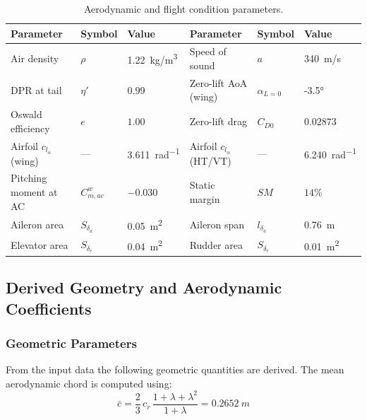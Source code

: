\begin{table}[H]
  \centering
  \caption{Aerodynamic and flight condition parameters.}
  \label{tab:aero_params}
  \begin{tabular}{lll lll}
    \toprule
    \textbf{Parameter} & \textbf{Symbol} & \textbf{Value}
    & \textbf{Parameter} & \textbf{Symbol} & \textbf{Value} \\
    \midrule
    Air density              & $\rho$              & \SI{1.22}{kg/m^3}
    & Speed of sound         & $a$                 & \SI{340}{m/s}    \\
    DPR at tail              & $\eta'$             & $0.99$
    & Zero-lift AoA (wing)   & $\alpha_{L=0}$      & \ang{-3.5}       \\
    Oswald efficiency        & $e$                 & $1.00$
    & Zero-lift drag         & $C_{D0}$            & $0.02873$        \\
    Airfoil $c_{l_\alpha}$ (wing) & ---           & \SI{3.611}{rad^{-1}}
    & Airfoil $c_{l_\alpha}$ (HT/VT) & ---        & \SI{6.240}{rad^{-1}} \\
    Pitching moment at AC    & $C_{m,ac}^{w}$      & $-0.030$
    & Static margin          & $SM$                & $14\%$           \\
    Aileron area             & $S_{\delta_a}$      & \SI{0.05}{m^2}
    & Aileron span           & $l_{\delta_a}$      & \SI{0.76}{m}     \\
    Elevator area            & $S_{\delta_e}$      & \SI{0.04}{m^2}
    & Rudder area            & $S_{\delta_r}$      & \SI{0.01}{m^2}   \\
    \bottomrule
  \end{tabular}
\end{table}

\subsection{Derived Geometry and Aerodynamic Coefficients}
\label{subsec:geometry_aero}

\subsubsection{Geometric Parameters}

From the input data the following geometric quantities are derived. The mean aerodynamic chord is computed using:
\begin{equation}
  \bar{c} = \frac{2}{3}\,c_r\,\frac{1+\lambda+\lambda^2}{1+\lambda}
  = \SI{0.2652}{m}
  \label{eq:mac}
\end{equation}


